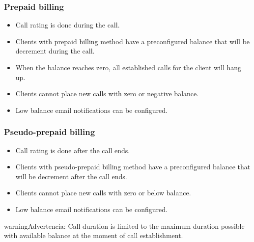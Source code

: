 \documentclass[letterpaper,10pt,spanish]{sphinxmanual}
\begin{document}
\subsubsection{Prepaid billing}
\label{administration_portal/brand/billing/index:prepaid-billing}\label{administration_portal/brand/billing/index:id3}\begin{itemize}
\item {} 
Call rating is done during the call.

\item {} 
Clients with prepaid billing method have a preconfigured balance that will be decrement during the call.

\item {} 
When the balance reaches zero, all established calls for the client will hang up.

\item {} 
Clients cannot place new calls with zero or negative balance.

\item {} 
Low balance email notifications can be configured.

\end{itemize}


\subsubsection{Pseudo-prepaid billing}
\label{administration_portal/brand/billing/index:id4}\label{administration_portal/brand/billing/index:pseudo-prepaid-billing}\begin{itemize}
\item {} 
Call rating is done after the call ends.

\item {} 
Clients with pseudo-prepaid billing method have a preconfigured balance that will be decrement after the call ends.

\item {} 
Clients cannot place new calls with zero or below balance.

\item {} 
Low balance email notifications can be configured.

\end{itemize}

\begin{notice}{warning}{Advertencia:}
Call duration is limited to the maximum duration possible with available balance at the moment of call establishment.
\end{notice}
\end{document}
